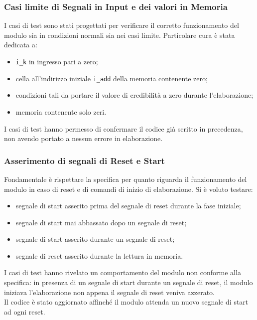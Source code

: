 \documentclass{article}
\begin{document}
\subsubsection{Casi limite di Segnali in Input e dei valori in Memoria}
    I casi di test sono stati progettati per verificare il corretto funzionamento del modulo sia in condizioni normali sia nei casi limite. Particolare cura è stata dedicata a:
    \begin{itemize}[label=\raisebox{0.25ex}{\tiny$\bullet$}]
        \setlength{\itemsep}{0pt}
        \item \texttt{i\_k} in ingresso pari a zero;
        \item cella all'indirizzo iniziale \texttt{i\_add} della memoria contenente zero;
        \item condizioni tali da portare il valore di credibilità a zero durante l'elaborazione;
        \item memoria contenente solo zeri.
    \end{itemize}
    I casi di test hanno permesso di confermare il codice già scritto in precedenza, non avendo portato a nessun errore in elaborazione.
\subsubsection{Asserimento di segnali di Reset e Start}
    Fondamentale è rispettare la specifica per quanto riguarda il funzionamento del modulo in caso di reset e di comandi di inizio di elaborazione. Si è voluto testare:
    \begin{itemize}[label=\raisebox{0.25ex}{\tiny$\bullet$}]
        \setlength{\itemsep}{0pt}
        \item segnale di start asserito prima del segnale di reset durante la fase iniziale;
        \item segnale di start mai abbassato dopo un segnale di reset;
        \item segnale di start asserito durante un segnale di reset;
        \item segnale di reset asserito durante la lettura in memoria.
    \end{itemize}
    I casi di test hanno rivelato un comportamento del modulo non conforme alla specifica: in presenza di un segnale di start durante un segnale di reset, il modulo iniziava l'elaborazione non appena il segnale di reset veniva azzerato.
    \medskip \\ Il codice è stato aggiornato affinché il modulo attenda un nuovo segnale di start ad ogni reset.
\end{document}
